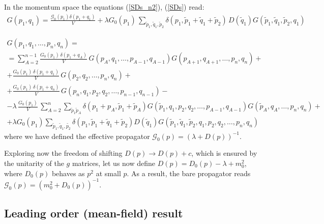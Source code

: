 \documentclass[12pt]{article}
\newcommand{\lr}[1]{ \left( #1 \right) }
\newcommand{\G}{\mathcal{G}}
\begin{document}
In the momentum space the equations (\ref{SDs_n2}), (\ref{SDs}) read:
\begin{eqnarray}
\label{SDs_n2_momentum}
 G\lr{p_1, q_1} = \frac{\G_0\lr{p_1} \delta\lr{p_1 + q_1}}{V}
 +
 \lambda G_0\lr{p_1} \,
\sum\limits_{\tilde{p}_1, \tilde{q}_1, \tilde{p}_2}
\delta\lr{p_1, \tilde{p}_1 + \tilde{q}_1 + \tilde{p}_2} \,
D\lr{\tilde{q}_1} G\lr{\tilde{p}_1, \tilde{q}_1, \tilde{p}_2, q_1}
\end{eqnarray}

\begin{eqnarray}
\label{SDs_pcm_momentum}
 G\lr{p_1, q_1, \ldots, p_n, q_n}
 = \nonumber \\ =
 \sum\limits_{A=2}^{n-1}
 \frac{G_0\lr{p_1} \, \delta\lr{p_1 + q_A}}{V} \,
 G\lr{    p_A,     q_1, \ldots, p_{A-1}, q_{A-1}}
 G\lr{p_{A+1}, q_{A+1}, \ldots,     p_n,    q_n }
 + \nonumber \\ +
 \frac{G_0\lr{p_1} \, \delta\lr{p_1 + q_1}}{V} \,
 G\lr{p_2, q_2, \ldots, p_n, q_n}
 + \nonumber \\ +
 \frac{G_0\lr{p_1} \, \delta\lr{p_1 + q_n}}{V} \,
 G\lr{p_n, q_1, p_2, q_2, \ldots, p_{n-1}, q_{n-1}}
 - \nonumber \\ -
 \lambda \, \frac{G_0\lr{p_1}}{V} \,
 \sum\limits_{A=2}^{n}
 \sum\limits_{\tilde{p}_1 \tilde{p}_A} \delta\lr{p_1 + p_A, \tilde{p}_1 + \tilde{p}_A}
 G\lr{\tilde{p}_1, q_1, p_2, q_2, \ldots, p_{A-1}, q_{A-1}}
 G\lr{\tilde{p}_A, q_A,           \ldots, p_n, q_n}
 + \nonumber \\ +
 \lambda G_0\lr{p_1}
 \sum\limits_{\tilde{p}_1, \tilde{q}_1, \tilde{p_2}}
 \delta\lr{p_1, \tilde{p}_1 + \tilde{q}_1 + \tilde{p}_2} D\lr{\tilde{q}_1}
 G\lr{\tilde{p}_1, \tilde{q}_1, \tilde{p}_2, q_1, p_2, q_2, \ldots, p_n, q_n}
\end{eqnarray}
where we have defined the effective propagator $\G_0\lr{p} = \lr{\lambda + D\lr{p}}^{-1}$.

Exploring now the freedom of shifting $D\lr{p} \rightarrow D\lr{p} + c$, which is ensured by the unitarity of the $g$ matrices, let us now define $D\lr{p} = D_0\lr{p} - \lambda + m_0^2$, where $D_0\lr{p}$ behaves as $p^2$ at small $p$. As a result, the bare propagator reads $\G_0\lr{p} = \lr{m_0^2 + D_0\lr{p}}^{-1}$.

\subsection*{Leading order (mean-field) result}
\end{document}
